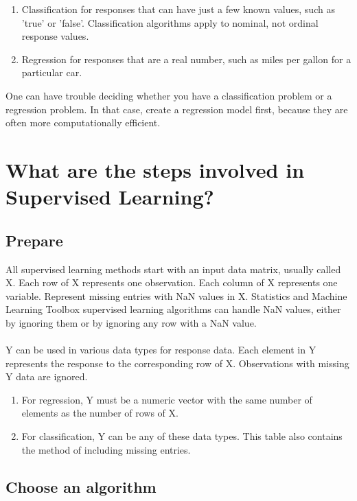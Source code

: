 \documentclass[a4paper, 12pt]{article}
\begin{document}
\begin{enumerate}
\item Classification for responses that can have just a few known values, such as 'true' or 'false'. Classification algorithms apply to nominal, not ordinal response values.
\item Regression for responses that are a real number, such as miles per gallon for a particular car.
\end{enumerate}

One can have trouble deciding whether you have a classification problem or a regression problem. In that case, create a regression model first, because they are often more computationally efficient.

\section{What are the steps involved in Supervised Learning?}

\subsection{Prepare}

All supervised learning methods start with an input data matrix, usually called X. Each row of X represents one observation. Each column of X represents one variable. Represent missing entries with NaN values in X. Statistics and Machine Learning Toolbox supervised learning algorithms can handle NaN values, either by ignoring them or by ignoring any row with a NaN value.\\\\Y can be used in various data types for response data. Each element in Y represents the response to the corresponding row of X. Observations with missing Y data are ignored.

\begin{enumerate}
\item For regression, Y must be a numeric vector with the same number of elements as the number of rows of X.
\item For classification, Y can be any of these data types. This table also contains the method of including missing entries.
\end{enumerate}

\subsection{Choose an algorithm}
\end{document}
